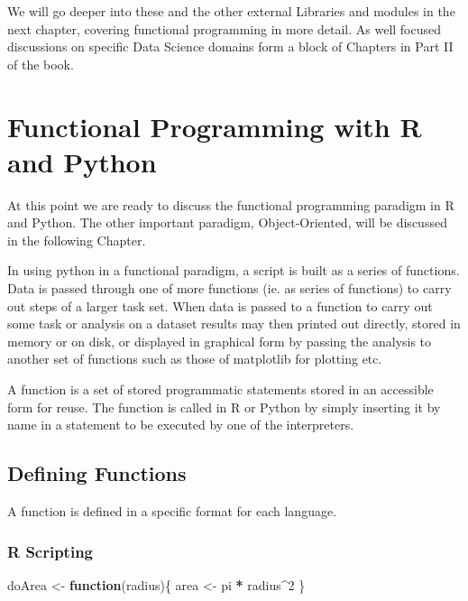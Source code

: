 \documentclass[]{book}
\newenvironment{Shaded}{\begin{snugshade}}{\end{snugshade}}
\newcommand{\DecValTok}[1]{\textcolor[rgb]{0.00,0.00,0.81}{#1}}
\newcommand{\StringTok}[1]{\textcolor[rgb]{0.31,0.60,0.02}{#1}}
\newcommand{\ControlFlowTok}[1]{\textcolor[rgb]{0.13,0.29,0.53}{\textbf{#1}}}
\newcommand{\OperatorTok}[1]{\textcolor[rgb]{0.81,0.36,0.00}{\textbf{#1}}}
\newcommand{\NormalTok}[1]{#1}
\theoremstyle{definition}
\theoremstyle{definition}
\theoremstyle{definition}
\theoremstyle{remark}
\begin{document}
We will go deeper into these and the other external Libraries and
modules in the next chapter, covering functional programming in more
detail. As well focused discussions on specific Data Science domains
form a block of Chapters in Part II of the book.

\chapter{Functional Programming with R and
Python}\label{functional-programming-with-r-and-python}

At this point we are ready to discuss the functional programming
paradigm in R and Python. The other important paradigm, Object-Oriented,
will be discussed in the following Chapter.

In using python in a functional paradigm, a script is built as a series
of functions. Data is passed through one of more functions (ie. as
series of functions) to carry out steps of a larger task set. When data
is passed to a function to carry out some task or analysis on a dataset
results may then printed out directly, stored in memory or on disk, or
displayed in graphical form by passing the analysis to another set of
functions such as those of matplotlib  for plotting
etc.

A function is a set of stored programmatic statements stored in an
accessible form for reuse. The function is called in R or Python by
simply inserting it by name in a statement to be executed by one of the
interpreters.

\section{Defining Functions}\label{defining-functions}

A function is defined in a specific format for each language.

\subsection{R Scripting}\label{r-scripting-1}

\begin{Shaded}
\begin{Highlighting}[]
\NormalTok{doArea <-}\StringTok{ }\ControlFlowTok{function}\NormalTok{(radius)\{}
\NormalTok{  area <-}\StringTok{ }\NormalTok{pi }\OperatorTok{*}\StringTok{ }\NormalTok{radius}\OperatorTok{^}\DecValTok{2}
\NormalTok{\}}
\end{Highlighting}
\end{Shaded}
\end{document}

